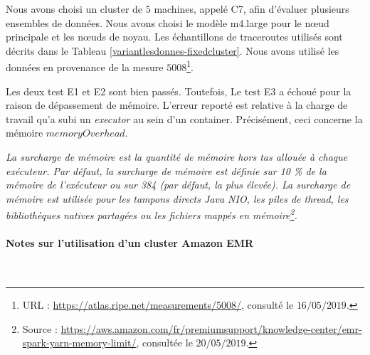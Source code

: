 Nous avons choisi un cluster de $ 5 $ machines, appelé C7, afin d'évaluer plusieurs ensembles de données. Nous avons choisi le modèle m4.large pour le n\oe{}ud principale et les n\oe{}uds de noyau. Les échantillons de traceroutes utilisés sont décrits dans le Tableau \ref{variantlesdonnes-fixedcluster}. Nous avons utilisé les données en provenance de la mesure $ 5008 $\footnote{URL : \url{https://atlas.ripe.net/measurements/5008/}, consulté le $16/05/2019$.}.


\begin{table}[H]
	\centering
\caption{Les traceroutes utilisés dans le cluster C7}
\label{variantlesdonnes-fixedcluster}
\end{table}

Les deux test E1 et E2 sont bien passés. Toutefois, Le test E3 a échoué pour la raison de dépassement de mémoire. L'erreur reporté est relative à la charge de travail qu'a subi un \textit{executor} au sein d'un container. Précisément, ceci concerne la mémoire $ memoryOverhead $. 

\textit{La surcharge de mémoire est la quantité de mémoire hors tas allouée à chaque exécuteur. Par défaut, la surcharge de mémoire est définie sur 10 \% de la mémoire de l'exécuteur ou sur 384 (par défaut, la plus élevée). La surcharge de mémoire est utilisée pour les tampons directs Java NIO, les piles de thread, les bibliothèques natives partagées ou les fichiers mappés en mémoire\footnote{Source : \url{https://aws.amazon.com/fr/premiumsupport/knowledge-center/emr-spark-yarn-memory-limit/}, consultée le $20/05/2019$.}.}

\paragraph{Notes sur l'utilisation d'un cluster Amazon EMR}~

